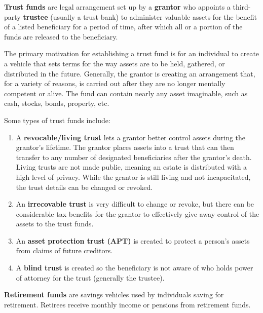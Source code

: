 \documentclass{article}
\begin{document}
      \begin{definition}
        \textbf{Trust funds} are legal arrangement set up by a \textbf{grantor} who appoints a third-party \textbf{trustee} (usually a trust bank) to administer valuable assets for the benefit of a listed beneficiary for a period of time, after which all or a portion of the funds are released to the beneficiary. 

        The primary motivation for establishing a trust fund is for an individual to create a vehicle that sets terms for the way assets are to be held, gathered, or distributed in the future. Generally, the grantor is creating an arrangement that, for a variety of reasons, is carried out after they are no longer mentally competent or alive. The fund can contain nearly any asset imaginable, such as cash, stocks, bonds, property, etc. 

        Some types of trust funds include: 
        \begin{enumerate}
          \item A \textbf{revocable/living trust} lets a grantor better control assets during the grantor's lifetime. The grantor places assets into a trust that can then transfer to any number of designated beneficiaries after the grantor's death. Living trusts are not made public, meaning an estate is distributed with a high level of privacy. While the grantor is still living and not incapacitated, the trust details can be changed or revoked. 
          \item An \textbf{irrecovable trust} is very difficult to change or revoke, but there can be considerable tax benefits for the grantor to effectively give away control of the assets to the trust funds. 
          \item An \textbf{asset protection trust (APT)} is created to protect a person's assets from claims of future creditors. 
          \item A \textbf{blind trust} is created so the beneficiary is not aware of who holds power of attorney for the trust (generally the trustee). 
        \end{enumerate}
      \end{definition}

      \begin{definition}
        \textbf{Retirement funds} are savings vehicles used by individuals saving for retirement. Retirees receive monthly income or pensions from retirement funds.
      \end{definition}
\end{document}
